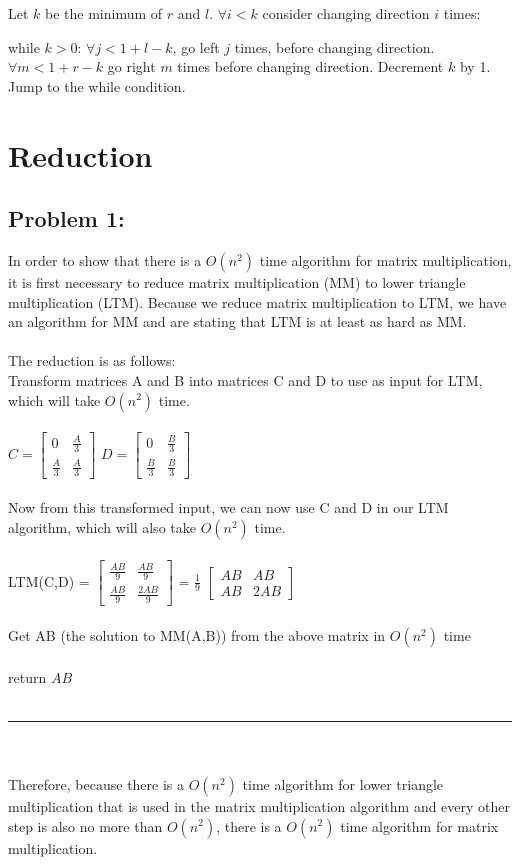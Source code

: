 \documentclass[12pt]{article}
\begin{document}
Let $k$ be the minimum of $r$ and $l$. $\forall i < k$ consider changing direction $i$ times:

while $ k > 0$:
$\forall j < 1+ l - k$, go left $j$ times, before changing direction.
$\forall m < 1 + r - k$ go right $m$ times before changing direction.
Decrement $k$ by 1. Jump to the while condition.

\section*{Reduction}
\subsection*{Problem 1: }
In order to show that there is a {$O(n^2)$} time algorithm for matrix multiplication, it is first necessary to reduce matrix multiplication (MM) to lower triangle multiplication (LTM). Because we reduce matrix multiplication to LTM, we have an algorithm for MM and are stating that LTM is at least as hard as MM.\\\\
The reduction is as follows:\\

Transform matrices A and B into matrices C and D to use as input for LTM, which will take {$O(n^2)$} time.\\\\
$C = \begin{bmatrix}
0 & \frac{A}{3}\\[0.3em]
\frac{A}{3} & \frac{A}{3}
\end{bmatrix}$
$D = \begin{bmatrix}
0 & \frac{B}{3}\\[0.3em]
\frac{B}{3} & \frac{B}{3}
\end{bmatrix}$\\\\
Now from this transformed input, we can now use C and D in our LTM algorithm, which will also take {$O(n^2)$} time.\\\\
LTM(C,D) = $\begin{bmatrix}
\frac{AB}{9} & \frac{AB}{9}\\[0.3em]
\frac{AB}{9} & \frac{2AB}{9}
\end{bmatrix}$
=
{$\frac{1}{9}$} $\begin{bmatrix}
AB & AB\\[0.3em]
AB & 2AB
\end{bmatrix}$ \\\\
Get AB (the solution to MM(A,B)) from the above matrix in {$O(n^2)$} time\\\\
{return $AB$}\\\\
\noindent\rule{14cm}{0.4pt}\\\\
Therefore, because there is a {$O(n^2)$} time algorithm for lower triangle multiplication that is used in the matrix multiplication algorithm and every other step is also no more than {$O(n^2)$}, there is a {$O(n^2)$} time algorithm for matrix multiplication.
\end{document}
